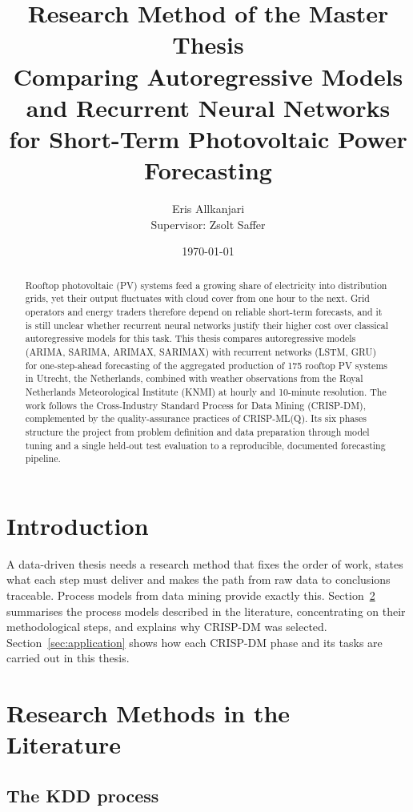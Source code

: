 \documentclass[11pt,a4paper]{article}
\title{Research Method of the Master Thesis\\[4pt]
\large Comparing Autoregressive Models and Recurrent Neural Networks\\
for Short-Term Photovoltaic Power Forecasting}
\author{Eris Allkanjari\\[2pt]
\small Supervisor: Zsolt Saffer}
\date{\today}
\begin{document}
\maketitle

\begin{abstract}
\noindent
Rooftop photovoltaic (PV) systems feed a growing share of electricity into
distribution grids, yet their output fluctuates with cloud cover from one hour
to the next. Grid operators and energy traders therefore depend on reliable
short-term forecasts, and it is still unclear whether recurrent neural networks
justify their higher cost over classical autoregressive models for this task.
This thesis compares autoregressive models (ARIMA, SARIMA, ARIMAX, SARIMAX) with
recurrent networks (LSTM, GRU) for one-step-ahead forecasting of the aggregated
production of 175 rooftop PV systems in Utrecht, the Netherlands, combined with
weather observations from the Royal Netherlands Meteorological Institute (KNMI)
at hourly and 10-minute resolution. The work follows the Cross-Industry Standard
Process for Data Mining (CRISP-DM), complemented by the quality-assurance
practices of CRISP-ML(Q). Its six phases structure the project from problem
definition and data preparation through model tuning and a single held-out test
evaluation to a reproducible, documented forecasting pipeline.
\end{abstract}

\section{Introduction}

A data-driven thesis needs a research method that fixes the order of work,
states what each step must deliver and makes the path from raw data to
conclusions traceable. Process models from data mining provide exactly this.
Section~\ref{sec:literature} summarises the process models described in the
literature, concentrating on their methodological steps, and explains why
CRISP-DM was selected. Section~\ref{sec:application} shows how each CRISP-DM
phase and its tasks are carried out in this thesis.

\section{Research Methods in the Literature}
\label{sec:literature}

\subsection{The KDD process}
\end{document}
